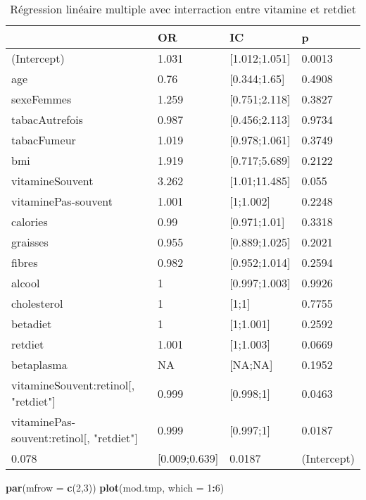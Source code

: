\documentclass[]{article}
\newenvironment{Shaded}{\begin{snugshade}}{\end{snugshade}}
\newcommand{\KeywordTok}[1]{\textcolor[rgb]{0.13,0.29,0.53}{\textbf{#1}}}
\newcommand{\DataTypeTok}[1]{\textcolor[rgb]{0.13,0.29,0.53}{#1}}
\newcommand{\DecValTok}[1]{\textcolor[rgb]{0.00,0.00,0.81}{#1}}
\newcommand{\OperatorTok}[1]{\textcolor[rgb]{0.81,0.36,0.00}{\textbf{#1}}}
\newcommand{\NormalTok}[1]{#1}
\begin{document}
\begin{table}

\caption{\label{tab:unnamed-chunk-87}Régression linéaire multiple avec interraction entre vitamine et retdiet}
\centering
\begin{tabular}[t]{l|l|l|l}
\hline
  & OR & IC & p\\
\hline
\rowcolor[HTML]{BBD2E1}  (Intercept) & 1.031 & [1.012;1.051] & 0.0013\\
\hline
age & 0.76 & [0.344;1.65] & 0.4908\\
\hline
\rowcolor[HTML]{BBD2E1}  sexeFemmes & 1.259 & [0.751;2.118] & 0.3827\\
\hline
tabacAutrefois & 0.987 & [0.456;2.113] & 0.9734\\
\hline
\rowcolor[HTML]{BBD2E1}  tabacFumeur & 1.019 & [0.978;1.061] & 0.3749\\
\hline
bmi & 1.919 & [0.717;5.689] & 0.2122\\
\hline
\rowcolor[HTML]{BBD2E1}  vitamineSouvent & 3.262 & [1.01;11.485] & 0.055\\
\hline
vitaminePas-souvent & 1.001 & [1;1.002] & 0.2248\\
\hline
\rowcolor[HTML]{BBD2E1}  calories & 0.99 & [0.971;1.01] & 0.3318\\
\hline
graisses & 0.955 & [0.889;1.025] & 0.2021\\
\hline
\rowcolor[HTML]{BBD2E1}  fibres & 0.982 & [0.952;1.014] & 0.2594\\
\hline
alcool & 1 & [0.997;1.003] & 0.9926\\
\hline
\rowcolor[HTML]{BBD2E1}  cholesterol & 1 & [1;1] & 0.7755\\
\hline
betadiet & 1 & [1;1.001] & 0.2592\\
\hline
\rowcolor[HTML]{BBD2E1}  retdiet & 1.001 & [1;1.003] & 0.0669\\
\hline
betaplasma & NA & [NA;NA] & 0.1952\\
\hline
\rowcolor[HTML]{BBD2E1}  vitamineSouvent:retinol[, "retdiet"] & 0.999 & [0.998;1] & 0.0463\\
\hline
vitaminePas-souvent:retinol[, "retdiet"] & 0.999 & [0.997;1] & 0.0187\\
\hline
\rowcolor[HTML]{BBD2E1}  0.078 & [0.009;0.639] & 0.0187 & (Intercept)\\
\hline
\end{tabular}
\end{table}

\begin{Shaded}
\begin{Highlighting}[]
\KeywordTok{par}\NormalTok{(}\DataTypeTok{mfrow =} \KeywordTok{c}\NormalTok{(}\DecValTok{2}\NormalTok{,}\DecValTok{3}\NormalTok{))}
\KeywordTok{plot}\NormalTok{(mod.tmp, }\DataTypeTok{which =} \DecValTok{1}\OperatorTok{:}\DecValTok{6}\NormalTok{)}
\end{Highlighting}
\end{Shaded}
\end{document}
